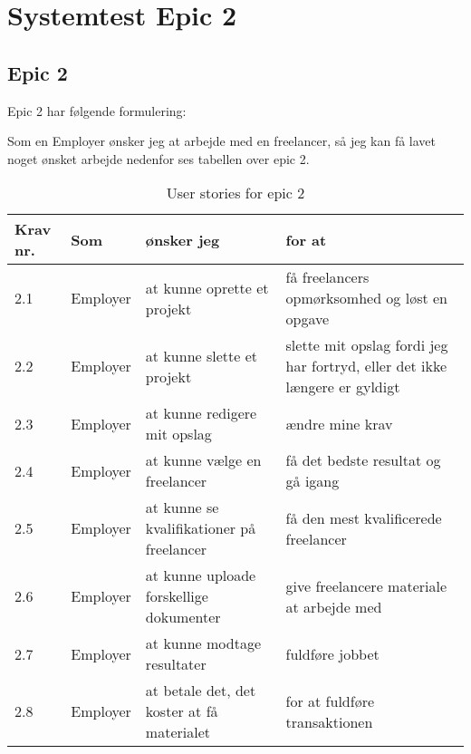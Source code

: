 
\chapter{Systemtest Epic 2}
\section{Epic 2}
Epic 2 har følgende formulering:

Som en Employer ønsker jeg at arbejde med en freelancer, så jeg kan få lavet noget ønsket arbejde
nedenfor ses tabellen over epic 2.


\begin{table}[H]
    \centering
    \caption{User stories for epic 2}
    \label{tab:us-epic2}
    \begin{tabular}{p{1cm}|p{2cm}|p{6cm}|p{6cm}}
        \textbf{Krav nr.} & \textbf{Som} & \textbf{ønsker jeg}                        & \textbf{for at}                                                                                     \\
        \hline
        2.1               & Employer     & at kunne oprette et projekt                & få freelancers opmørksomhed og løst en opgave                                                       \\
        \hline
        2.2               & Employer     & at kunne slette et projekt                 & \multicolumn{1}{p{6cm}}{slette mit opslag fordi jeg har fortryd, eller det ikke længere er gyldigt} \\
        \hline
        2.3               & Employer     & at kunne redigere mit opslag               & ændre mine krav                                                                                     \\
        \hline
        2.4               & Employer     & at kunne vælge en freelancer               & få det bedste resultat og gå igang                                                                  \\
        \hline
        2.5               & Employer     & at kunne se kvalifikationer på freelancer  & få den mest kvalificerede freelancer                                                                \\
        \hline
        2.6               & Employer     & at kunne uploade forskellige dokumenter    & give freelancere materiale at arbejde med                                                           \\
        \hline
        2.7               & Employer     & at kunne modtage resultater                & fuldføre jobbet                                                                                     \\
        \hline
        2.8               & Employer     & at betale det, det koster at få materialet & for at fuldføre transaktionen                                                                       \\
    \end{tabular}
\end{table}

